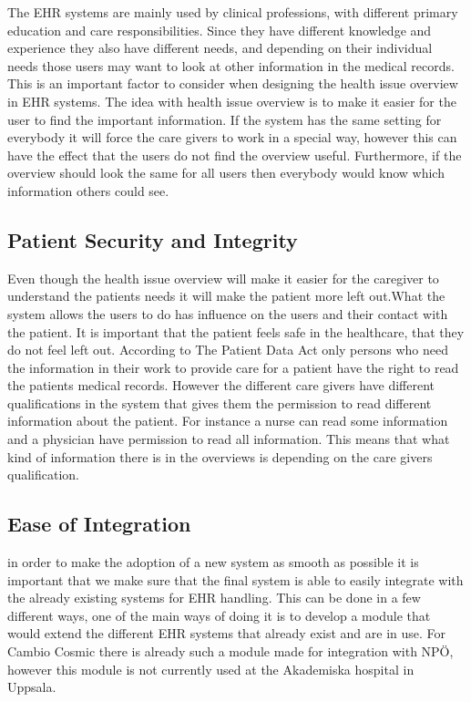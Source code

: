 \documentclass[14pt]{article}
\begin{document}
The \gls{EHR} systems are mainly used by clinical professions, with different primary education and care responsibilities. Since they have different knowledge and experience they also have different needs, and depending on their individual needs those users may want to look at other information in the medical records. This is an important factor to consider when designing the health issue overview in \gls{EHR} systems. The idea with health issue overview is to make it easier for the user to find the important information. If the system has the same setting for everybody it will force the care givers to work in a special way, however this can have the effect that the users do not find the overview useful.  Furthermore, if the overview should look the same for all users then everybody would know which information others could see.

\subsection{Patient Security and Integrity}
Even though the health issue overview will make it easier for the caregiver to understand the patients needs it will make the patient more left out.What the system allows the users to do has influence on the users and their contact with the patient. It is important that the patient feels safe in the healthcare, that they do not feel left out. According to The Patient Data Act only persons who need the information in their work to provide care for a patient have the right to read the patients medical records. However the different care givers have different qualifications in the system that gives them the permission to read different information about the patient. For instance a nurse can read some information and a physician have permission to read all information. This means that what kind of information there is in the overviews is depending on the care givers qualification.

\subsection{Ease of Integration}
in order to make the adoption of a new system as smooth as possible it is important that we make sure that the final system is able to easily integrate with the already existing systems for \gls{EHR} handling. This can be done in a few different ways, one of the main ways of doing it is to develop a module that would extend the different \gls{EHR} systems that already exist and are in use.\cite{EPJ2} For Cambio Cosmic there is already such a module made for integration with NPÖ, however this module is not currently used at the Akademiska hospital in Uppsala\cite{EPJ1}.
\end{document}
